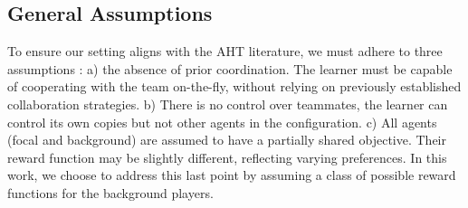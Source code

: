 \subsection{General Assumptions}
\label{sec:assumptions}
To ensure our setting aligns with the AHT literature, we must adhere to three assumptions \citep{mirsky_survey_ad_hoc_2022}: a) the absence of prior coordination. The learner must be capable of cooperating with the team on-the-fly, without relying on previously established collaboration strategies. b) There is no control over teammates, the learner can control its own copies but not other agents in the configuration. c) All agents (focal and background) are assumed to have a partially shared objective. Their reward function may be slightly different, reflecting varying preferences. In this work, we choose to address this last point by assuming a class of possible reward functions for the background players. 
